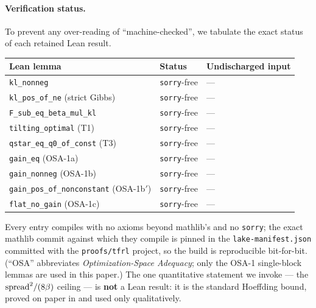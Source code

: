 \paragraph{Verification status.}
\label{app:lean-status}
To prevent any over-reading of ``machine-checked'', we tabulate the exact status of each retained Lean
result.

\begin{center}
\begin{tabular}{lll}
\hline
Lean lemma & Status & Undischarged input \\
\hline
\texttt{kl\_nonneg} & \texttt{sorry}-free & --- \\
\texttt{kl\_pos\_of\_ne} (strict Gibbs) & \texttt{sorry}-free & --- \\
\texttt{F\_sub\_eq\_beta\_mul\_kl} & \texttt{sorry}-free & --- \\
\texttt{tilting\_optimal} (T1) & \texttt{sorry}-free & --- \\
\texttt{qstar\_eq\_q0\_of\_const} (T3) & \texttt{sorry}-free & --- \\
\texttt{gain\_eq} (OSA-1a) & \texttt{sorry}-free & --- \\
\texttt{gain\_nonneg} (OSA-1b) & \texttt{sorry}-free & --- \\
\texttt{gain\_pos\_of\_nonconstant} (OSA-1b$'$) & \texttt{sorry}-free & --- \\
\texttt{flat\_no\_gain} (OSA-1c) & \texttt{sorry}-free & --- \\
\hline
\end{tabular}
\end{center}

\noindent
Every entry compiles with no axioms beyond mathlib's and no \texttt{sorry}; the exact mathlib commit
against which they compile is pinned in the \texttt{lake-manifest.json} committed with the
\texttt{proofs/tfrl} project, so the build is reproducible bit-for-bit. (``OSA'' abbreviates
\emph{Optimization-Space Adequacy}; only the OSA-1 single-block lemmas are used in this paper.) The
one quantitative statement we invoke --- the $\mathrm{spread}^2/(8\beta)$ ceiling --- is \textbf{not} a Lean
result: it is the standard Hoeffding bound, proved on paper in  and used only
qualitatively.

